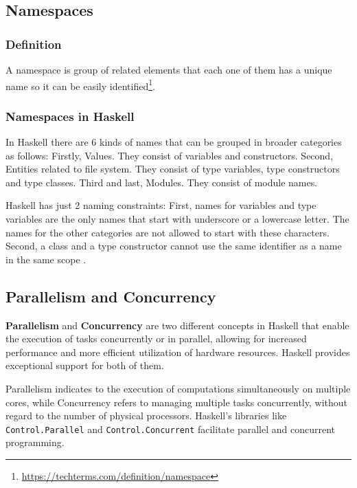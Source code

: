 \documentclass[a4paper, titlepage, twoside]{article}
\begin{document}
\subsection{Namespaces}
\label{sec:orge9f7c73}

\subsubsection{Definition}
\label{sec:org9233ebf}

A namespace is group of related elements that each one of them has a unique name so it can be easily identified\footnote{\url{https://techterms.com/definition/namespace}}.

\subsubsection{Namespaces in Haskell}
\label{sec:orga48df71}

In Haskell there are 6 kinds of names that can be grouped in broader categories as follows: Firstly, Values. They consist of variables and constructors. Second, Entities related to file system. They consist of type variables, type constructors and type classes. Third and last, Modules. They consist of module names.

Haskell has just 2 naming constraints: First, names for variables and type variables are the only names that start with underscore or a lowercase letter. The names for the other categories are not allowed to start with these characters. Second, a class and a type constructor cannot use the same identifier as a name in the same scope \autocite{marlowHaskell2010Language2010}.

\subsection{Parallelism and Concurrency}
\label{sec:orgf548096}

\textbf{Parallelism} and \textbf{Concurrency} are two different concepts in Haskell that enable the execution of tasks concurrently or in parallel, allowing for increased performance and more efficient utilization of hardware resources. Haskell provides exceptional support for both of them.

Parallelism indicates to the execution of computations simultaneously on multiple cores, while Concurrency refers to managing multiple tasks concurrently, without regard to the number of physical processors. Haskell's libraries like \texttt{Control.Parallel} and \texttt{Control.Concurrent} facilitate parallel and concurrent programming.
\end{document}

